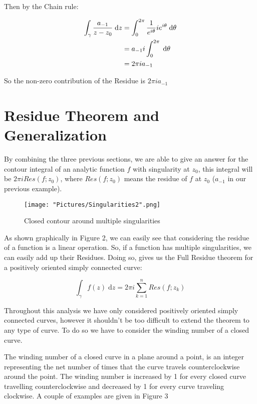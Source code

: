 \documentclass[12pt, letterpaper]{article}
\begin{document}
\noindent
Then by the Chain rule: 

\begin{align*}
\centering 
\int_{\gamma}^{} \frac{a_{-1}}{z - z_{0}} \;\mathrm{d}z &= \int_{0}^{2\pi} \frac{1}{e^{i\theta}} ie^{i\theta} \;\mathrm{d}\theta \\
&= a_{-1}i\int_{0}^{2\pi}\;\mathrm{d}\theta \\
&= 2\pi i a_{-1}
\end{align*}

\noindent
So the non-zero contribution of the Residue is \(2\pi i a_{-1}\)
\bigskip

\section*{Residue Theorem and Generalization}

\noindent
By combining the three previous sections, we are able to give an answer for the contour integral of an analytic function \(f\) with singularity at \(z_{0}\), this integral will be \(2\pi i Res(f;z_{0})\), where \(Res(f;z_{0})\) means the residue of \(f\) at \(z_{0}\) (\(a_{-1}\) in our previous example). 

\begin{figure}[h]
    \centering
    \texttt{[image: "Pictures/Singularities2".png]}
    \caption{Closed contour around multiple singularities}
    \label{fig:my_label3}
\end{figure}

\noindent
As shown graphically in Figure 2, we can easily see that considering the residue of a function is a linear operation. So, if a function has multiple singularities, we can easily add up their Residues. Doing so, gives us the Full Residue theorem for a positively oriented simply connected curve:

\[\int_{\gamma}^{} f(z) \;\mathrm{d}z = 2\pi i \sum_{k=1}^{n} Res(f;z_{k}) \]

\noindent
Throughout this analysis we have only considered positively oriented simply connected curves, however it shouldn't be too difficult to extend the theorem to any type of curve. To do so we have to consider the winding number of a closed curve. 
\bigskip

\noindent
The winding number of a closed curve in a plane around a point, is an integer representing the net number of times that the curve travels counterclockwise around the point. The winding number is increased by 1 for every closed curve travelling counterclockwise and decreased by 1 for every curve traveling clockwise. A couple of examples are given in Figure 3
\end{document}
